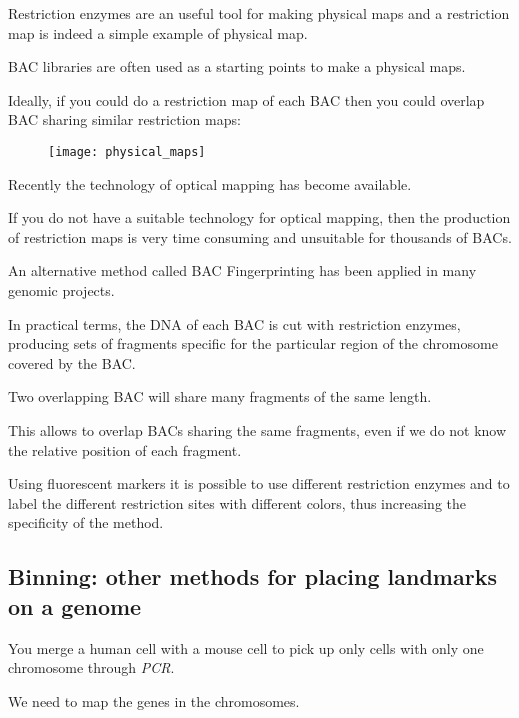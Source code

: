 Restriction enzymes are an useful tool for making physical maps and a
restriction map is indeed a simple example of physical map.

BAC libraries are often used as a starting points to make a physical maps.

Ideally, if you could do a restriction map of each BAC then you could overlap
BAC sharing similar restriction maps:

\begin{figure}[H]
  \centering
  \texttt{[image: physical\_maps]}
  \caption{}
  \label{fig:physica_maps}
\end{figure}

Recently the technology of optical mapping has become available.

If you do not have a suitable technology for optical mapping, then the
production of restriction maps is very time consuming and unsuitable for
thousands of BACs.

An alternative method called BAC Fingerprinting has been applied in many
genomic projects.

In practical terms, the DNA of each BAC is cut with restriction enzymes,
producing sets of fragments specific for the particular region of the
chromosome covered by the BAC.

Two overlapping BAC will share many fragments of the same length.

This allows to overlap BACs sharing the same fragments, even if we do not know
the relative position of each fragment.

Using fluorescent markers it is possible to use different restriction enzymes
and to label the different restriction sites with different colors, thus
increasing the specificity of the method.

\subsection{Binning: other methods for placing landmarks on a genome}

You merge a human cell with a mouse cell to pick up only cells with only one
chromosome through \textit{PCR}.

We need to map the genes in the chromosomes.
